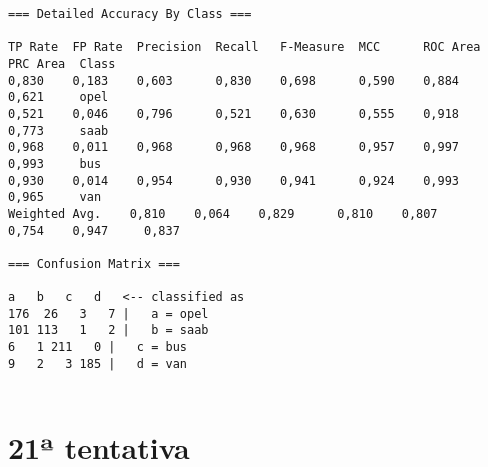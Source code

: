 \documentclass[
	article,			%
	11pt,				%
	oneside,			%
	a4paper,			%
	english,			%
	brazil,				%
	sumario=tradicional
	]{abntex2}
\begin{document}
\begin{lstlisting}
=== Detailed Accuracy By Class ===

TP Rate  FP Rate  Precision  Recall   F-Measure  MCC      ROC Area  PRC Area  Class
0,830    0,183    0,603      0,830    0,698      0,590    0,884     0,621     opel
0,521    0,046    0,796      0,521    0,630      0,555    0,918     0,773     saab
0,968    0,011    0,968      0,968    0,968      0,957    0,997     0,993     bus
0,930    0,014    0,954      0,930    0,941      0,924    0,993     0,965     van
Weighted Avg.    0,810    0,064    0,829      0,810    0,807      0,754    0,947     0,837     

=== Confusion Matrix ===

a   b   c   d   <-- classified as
176  26   3   7 |   a = opel
101 113   1   2 |   b = saab
6   1 211   0 |   c = bus
9   2   3 185 |   d = van


\end{lstlisting}

\section{21ª tentativa}
\end{document}
